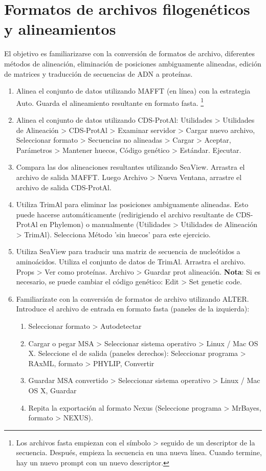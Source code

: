 \section{Formatos de archivos  filogenéticos y alineamientos}
El objetivo es familiarizarse con la conversión de formatos de archivo, diferentes métodos de alineación, eliminación de posiciones ambiguamente alineadas, edición de matrices y traducción de secuencias de ADN a proteínas.
\begin{enumerate}
\item Alinea el conjunto de datos utilizando MAFFT (en línea) con la estrategia Auto. Guarda el alineamiento resultante en formato fasta. \footnote{Los archivos fasta empiezan con el símbolo > seguido de un descriptor de la secuencia. Después, empieza la secuencia en una nueva línea. Cuando termine, hay un nuevo prompt con un nuevo descriptor.}
\item Alinea el conjunto de datos utilizando CDS-ProtAl: Utilidades > Utilidades de Alineación > CDS-ProtAl > Examinar servidor > Cargar nuevo archivo, Seleccionar formato > Secuencias no alineadas > Cargar > Aceptar, Parámetros > Mantener huecos, Código genético > Estándar. Ejecutar.
\item Compara las dos alineaciones resultantes utilizando SeaView. Arrastra el archivo de salida MAFFT. Luego Archivo > Nueva Ventana, arrastre el archivo de salida CDS-ProtAl.
\item Utiliza TrimAl para eliminar las posiciones ambiguamente alineadas. Esto puede hacerse automáticamente (redirigiendo el archivo resultante de CDS-ProtAl en Phylemon) o manualmente (Utilidades > Utilidades de Alineación > TrimAl). Selecciona Método 'sin huecos' para este ejercicio.
\item Utiliza SeaView para traducir una matriz de secuencia de nucleótidos a aminoácidos. Utiliza el conjunto de datos de TrimAl. Arrastra el archivo. Props > Ver como proteínas. Archivo > Guardar prot alineación. \textbf{Nota}: Si es necesario, se puede cambiar el código genético: Edit > Set genetic code.
\item Familiarízate con la conversión de formatos de archivo utilizando ALTER. Introduce el archivo de entrada en formato fasta (paneles de la izquierda): 
\begin{enumerate}
\item Seleccionar formato > Autodetectar
\item Cargar o pegar MSA > Seleccionar sistema operativo > Linux / Mac OS X. Seleccione el de salida (paneles derechos): Seleccionar programa > RAxML, formato > PHYLIP, Convertir
\item Guardar MSA convertido > Seleccionar sistema operativo > Linux / Mac OS X, Guardar
\item Repita la exportación al formato Nexus (Seleccione programa > MrBayes, formato > NEXUS).
\end{enumerate}
\end{enumerate}

